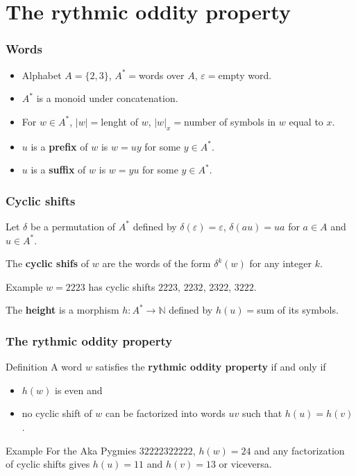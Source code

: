 \documentclass{beamer}
\theoremstyle{definition}
\begin{document}



\section{The rythmic oddity property}

\begin{frame}
\frametitle{Words}
\begin{itemize}
\item<1-> Alphabet $A=\{2,3\}$, $A^*=$words over $A$, $\varepsilon=$empty word. 
\item<2-> $A^*$ is a monoid under concatenation.
\item<3-> For $w\in A^*$, $|w|=$lenght of $w$, $|w|_x=$number of symbols in $w$ equal to $x$.
\item<4-> $u$ is a \textbf{prefix} of $w$ is $w=uy$ for some $y\in A^*$.
\item<5-> $u$ is a \textbf{suffix} of $w$ is $w=yu$ for some $y\in A^*$.
\end{itemize}
\end{frame}

\begin{frame}
\frametitle{Cyclic shifts}
Let $\delta$ be a permutation of $A^*$ defined by $\delta(\varepsilon)=\varepsilon$, $\delta(au)=ua$ for $a\in A$ and $u\in A^*$.

The \textbf{cyclic shifs} of $w$ are the words of the form $\delta^k(w)$ for any integer $k$. 

\begin{block}{Example}
$w=2223$ has cyclic shifts $2223$, $2232$, $2322$, $3222$.  
\end{block}
The \textbf{height} is a morphism $h:A^*\to\mathbb{N}$ defined by $h(u)=$sum of its symbols. 
\end{frame}

\begin{frame}
\frametitle{The rythmic oddity property}
\begin{block}{Definition}
A word $w$ satisfies the \textbf{rythmic oddity property} if and only if
\begin{itemize}
\item $h(w)$ is even and
\item no cyclic shift of $w$ can be factorized into words $uv$ such that $h(u)=h(v)$. 
\end{itemize}
\end{block}
\begin{block}{Example}
For the Aka Pygmies $32222322222$, $h(w)=24$ and any factorization of cyclic shifts gives $h(u)=11$ and $h(v)=13$ or viceversa. 
\end{block}
\end{frame}
\end{document}
